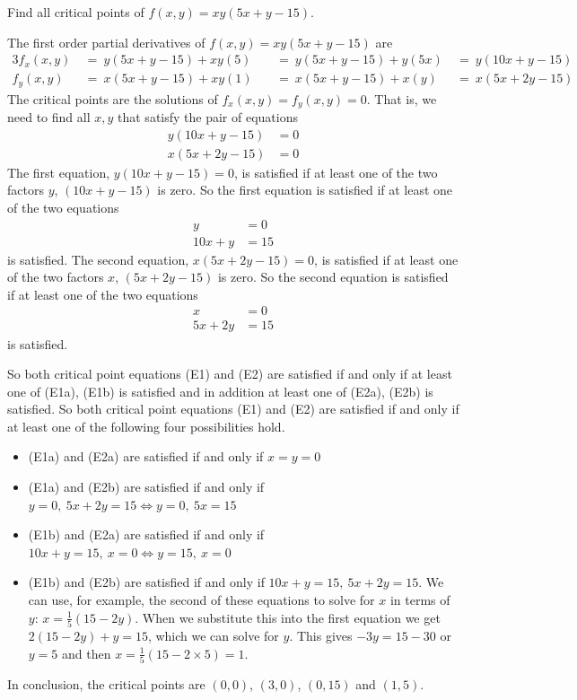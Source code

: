\begin{eg}[$f(x,y) = xy(5x+y-15)$]\label{eg:MXMNlocalC}
Find all critical points of $f(x,y)=xy(5x+y-15) $.


\soln 
The first order partial derivatives of $f(x,y)=xy(5x+y-15)$ are
\begin{alignat*}{3}
f_x(x,y)
&\ =\ y(5x+y-15)+xy(5)
&&\ =\ y(5x+y-15)+y(5x)
&\ =\  y(10x+y-15)
\\
f_y(x,y)
&\ =\ x(5x+y-15)+xy(1)
&&\ =\ x(5x+y-15)+ x(y)
&\ =\ x(5x+2y-15)
\end{alignat*}
The critical points are the solutions of $f_x(x,y)=f_y(x,y)=0$.
That is, we need to find all $x,y$ that satisfy the pair of equations
\begin{align*}
         y(10x+y-15)&=0\tag{E1} \\
         x(5x+2y-15)&=0\tag{E2}
\end{align*}
The first equation, $y(10x+y-15)=0$, is satisfied if at least one of the
two factors $y$, $(10x+y-15)$ is zero. So the first equation is satisfied 
if at least one of the two equations
\begin{subequations}
\begin{align*}
y&=0 \tag{E1a}\\
10x+y&=15 \tag{E1b}
\end{align*}
\end{subequations}
is satisfied.
The second equation, $x(5x+2y-15)=0$, is satisfied if at least one of the two
factors $x$, $(5x+2y-15)$ is zero. So the second equation is satisfied 
if at least one of the two equations
\begin{subequations}
\begin{align*}
x&=0 \tag{E2a}\\
5x+2y&=15 \tag{E2b}
\end{align*}
\end{subequations}
is satisfied.

So both critical point equations (E1) and (E2) are satisfied
if and only if at least one of (E1a), (E1b) is satisfied
and in addition at least one of (E2a), (E2b) is satisfied.
So both critical point equations (E1) and (E2) are satisfied
if and only if at least one of the following four possibilities hold.
\begin{itemize}
\item 
(E1a) and (E2a) are satisfied
if and only if $x=y=0$
\item 
(E1a) and (E2b) are satisfied
if and only if $y=0,\ 5x+2y=15 \iff y=0,\ 5x=15$
\item 
(E1b) and (E2a) are satisfied
if and only if $10x+y=15,\ x=0 \iff y=15,\ x=0$
\item 
(E1b) and (E2b) are satisfied
if and only if $10x+y=15,\ 5x+2y=15$. We can use, for example, the second
of these equations to solve for $x$ in terms of $y$: $x =\frac{1}{5}(15-2y)$.
When we substitute this into the first equation we get $2(15-2y)+y=15$,
which we can solve for $y$. This gives $-3y=15-30$ or $y=5$ and then
$x=\frac{1}{5}(15-2\times 5)=1$.
\end{itemize}
In conclusion, the critical points are $(0,0)$, $(3,0)$, $(0,15)$ and
$(1,5)$.


\end{eg}

